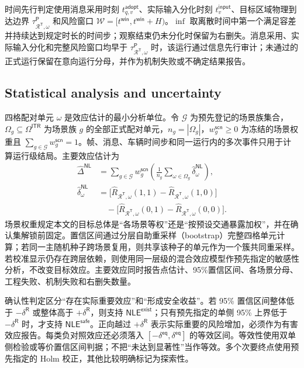 \documentclass[10pt,a4paper,twocolumn]{article}
\begin{document}
时间先行判定使用消息采用时刻 $t_{q,v}^{\mathsf{adopt}}$、实际输入分化时刻 $t_v^{\mathsf{input}}$、目标区域物理到达边界 $\tau_{\mathcal R^{\mathsf T},\omega}^{\mathsf P}$ 和风险窗口 $\mathcal W=[t^{\mathsf{win}},t^{\mathsf{win}}+H)$。$\inf$ 取离散时间中第一个满足容差并持续达到规定时长的时间步；观察结束仍未分化时保留为右删失。消息采用、实际输入分化和完整风险窗口均早于 $\tau_{\mathcal R^{\mathsf T},\omega}^{\mathsf P}$ 时，该运行通过信息先行审计；未通过的正式运行保留在意向运行分母，并作为机制失败或不确定结果报告。

\subsection*{Statistical analysis and uncertainty}
四格配对单元 $\omega$ 是效应估计的最小分析单位。令 $\mathcal G$ 为预先登记的场景族集合，$\Omega_g\subseteq\Omega^{\mathsf{ITR}}$ 为场景族 $g$ 的全部正式配对单元，$n_g=|\Omega_g|$，$w_g^{\mathsf{scn}}\geq0$ 为冻结的场景权重且 $\sum_{g\in\mathcal G}w_g^{\mathsf{scn}}=1$。帧、消息、车辆时间步和同一运行内的多次事件只用于计算运行级结局。主要效应估计为
\begin{equation*}
\begin{aligned}
\widehat{\Delta}^{\mathsf{NL}}&=
\sum_{g\in\mathcal G}w_g^{\mathsf{scn}}
\left(\frac{1}{n_g}\sum_{\omega\in\Omega_g}
\widehat{\delta}_{\omega}^{\mathsf{NL}}\right),\\
\widehat{\delta}_{\omega}^{\mathsf{NL}}&=
\bigl[\widehat R_{\mathcal R^{\mathsf T},\omega}(1,1)-\widehat R_{\mathcal R^{\mathsf T},\omega}(1,0)\bigr]\\
&\quad-\bigl[\widehat R_{\mathcal R^{\mathsf T},\omega}(0,1)-\widehat R_{\mathcal R^{\mathsf T},\omega}(0,0)\bigr].
\end{aligned}
\end{equation*}
场景权重规定本文的目标总体是“各场景等权”还是“按预设交通暴露加权”，并在确认集解锁前固定。置信区间通过分层自助重采样（bootstrap）完整四格单元计算；若同一主随机种子跨场景复用，则共享该种子的单元作为一个簇共同重采样。若校准显示仍存在跨层依赖，则使用同一层级的混合效应模型作预先指定的敏感性分析，不改变目标效应。主要效应同时报告点估计、95\%置信区间、各场景分母、工程失败、机制失败和右删失数量。

确认性判定区分“存在实际重要效应”和“形成安全收益”。若 95\% 置信区间整体低于 $-\delta^{\mathsf R}$ 或整体高于 $+\delta^{\mathsf R}$，则支持 $\mathsf{NLE}^{\mathsf{exist}}$；只有预先指定的单侧 95\% 上界低于 $-\delta^{\mathsf R}$ 时，才支持 $\mathsf{NLE}^{\mathsf{safe}}$。正向越过 $+\delta^{\mathsf R}$ 表示实际重要的风险增加，必须作为有害效应报告。每类负对照效应还必须落入 $[-\delta^{\mathsf{eq}},\delta^{\mathsf{eq}}]$ 的等效区间。等效性使用双单侧检验或等价置信区间判据；不把“未达到显著性”当作等效。多个次要终点使用预先指定的 Holm 校正，其他比较明确标记为探索性。
\end{document}
